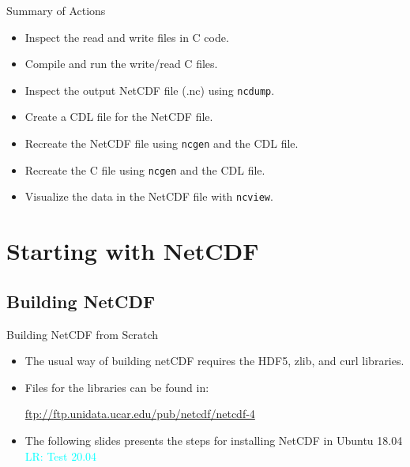 \documentclass[compress,11pt,xcolor=svgnames,aspectratio=169]{beamer}
\newcommand{\lr}[1]{\textcolor{cyan}{LR: #1}}
\begin{document}
\begin{frame}[fragile]{Summary of Actions}

\begin{itemize}
\setlength\itemsep{0.3cm}

  \item Inspect the read and write files in C code.
  \item Compile and run the write/read C files.
  \item Inspect the output NetCDF file (.nc) using \texttt{ncdump}.
  \item Create a CDL file for the NetCDF file.
  \item Recreate the NetCDF file using \texttt{ncgen} and the CDL file.
  \item Recreate the C file using \texttt{ncgen} and the CDL file.
  \item Visualize the data in the NetCDF file with \texttt{ncview}.

\end{itemize}

\end{frame}

\appendix

\begin{frame}[fragile]{}

{ \huge \color{EsiBlue}{ Appendix}}

\end{frame}

\section{Starting with NetCDF}
\label{ap:netcdf}

\subsection{Building NetCDF}

\begin{frame}[fragile]{Building NetCDF from Scratch}

\begin{itemize}
\setlength\itemsep{0.8cm}

  \item The usual way of building netCDF requires the HDF5, zlib, and curl libraries.

  \item Files for the libraries can be found in:

  \begin{center}
  \url{ftp://ftp.unidata.ucar.edu/pub/netcdf/netcdf-4}
  \end{center}

  \item The following slides presents the steps for installing NetCDF in Ubuntu 18.04 \lr{Test 20.04}

\end{itemize}

\end{frame}
\end{document}
